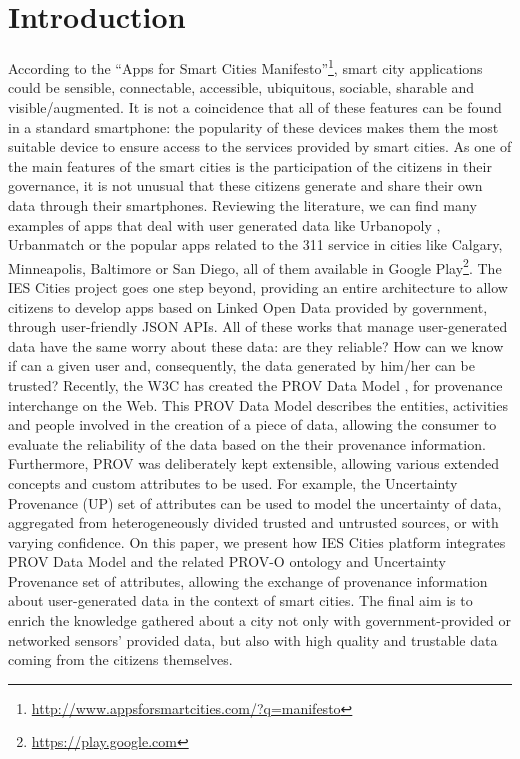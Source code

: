 \section{Introduction}
\label{sec:introduction}

According to the ``Apps for Smart Cities Manifesto''\footnote{\url{http://www.appsforsmartcities.com/?q=manifesto}}, smart city applications could be sensible, connectable, accessible, ubiquitous, sociable, sharable and visible/augmented. It is not a coincidence that all of these features can be found in a standard smartphone: the popularity of these devices makes them the most suitable device to ensure access to the services provided by smart cities. As one of the main features of the smart cities is the participation of the citizens in their governance, it is not unusual that these citizens generate and share their own data through their smartphones. Reviewing the literature, we can find many examples of apps that deal with user generated data like Urbanopoly \cite{celino_urbanopolysocial_2012}, Urbanmatch \cite{celino_urbanmatch-linking_2012} or the popular apps related to the 311 service in cities like Calgary, Minneapolis, Baltimore or San Diego, all of them available in Google Play\footnote{\url{https://play.google.com}}. The IES Cities project goes one step beyond, providing an entire architecture to allow citizens to develop apps based on Linked Open Data \cite{bizer_linked_2009} provided by government, through user-friendly JSON APIs. All of these works that manage user-generated data have the same worry about these data: are they reliable? How can we know if can a given user and, consequently, the data generated by him/her can be trusted? Recently, the W3C has created the PROV Data Model \cite{moreau_prov-dm:_2012}, for provenance interchange on the Web. This PROV Data Model describes the entities, activities and people involved in the creation of a piece of data, allowing the consumer to evaluate the reliability of the data based on the their provenance information. Furthermore, PROV was deliberately kept extensible, allowing various extended concepts and custom attributes to be used. For example, the Uncertainty Provenance (UP) \cite{de_nies_modeling_2013} set of attributes can be used to model the uncertainty of data, aggregated from heterogeneously divided trusted and untrusted sources, or with varying confidence. On this paper, we present how IES Cities platform integrates PROV Data Model and the related PROV-O ontology \cite{lebo_prov-o:_2013} and Uncertainty Provenance set of attributes, allowing the exchange of provenance information about user-generated data in the context of smart cities. The final aim is to enrich the knowledge gathered about a city not only with government-provided or networked sensors’ provided data, but also with high quality and trustable data coming from the citizens themselves.

